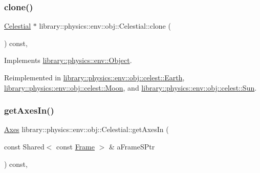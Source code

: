 \mbox{\label{classlibrary_1_1physics_1_1env_1_1obj_1_1_celestial_aaf8aa41a0ff9336eba62c07e3c27f82d}} 
\subsubsection{\texorpdfstring{clone()}{clone()}}
{\footnotesize\ttfamily \hyperlink{classlibrary_1_1physics_1_1env_1_1obj_1_1_celestial}{Celestial} $\ast$ library\+::physics\+::env\+::obj\+::\+Celestial\+::clone (\begin{DoxyParamCaption}{ }\end{DoxyParamCaption}) const\hspace{0.3cm}{\ttfamily [override]}, {\ttfamily [virtual]}}



Implements \hyperlink{classlibrary_1_1physics_1_1env_1_1_object_a498e0d1a15e937a5aa77374c6f899768}{library\+::physics\+::env\+::\+Object}.



Reimplemented in \hyperlink{classlibrary_1_1physics_1_1env_1_1obj_1_1celest_1_1_earth_aca39bec00a2046a3fcef9bf22be52428}{library\+::physics\+::env\+::obj\+::celest\+::\+Earth}, \hyperlink{classlibrary_1_1physics_1_1env_1_1obj_1_1celest_1_1_moon_a9d922ab338809a6c1052edbe11ce3e60}{library\+::physics\+::env\+::obj\+::celest\+::\+Moon}, and \hyperlink{classlibrary_1_1physics_1_1env_1_1obj_1_1celest_1_1_sun_a79fa2d336dad399c3d933b0f5a2f9427}{library\+::physics\+::env\+::obj\+::celest\+::\+Sun}.

\mbox{\label{classlibrary_1_1physics_1_1env_1_1obj_1_1_celestial_a51d7ed3c0dcf627fbbcd81f9b190fb6b}} 
\subsubsection{\texorpdfstring{get\+Axes\+In()}{getAxesIn()}}
{\footnotesize\ttfamily \hyperlink{classlibrary_1_1physics_1_1coord_1_1_axes}{Axes} library\+::physics\+::env\+::obj\+::\+Celestial\+::get\+Axes\+In (\begin{DoxyParamCaption}\item[{const Shared$<$ const \hyperlink{classlibrary_1_1physics_1_1coord_1_1_frame}{Frame} $>$ \&}]{a\+Frame\+S\+Ptr }\end{DoxyParamCaption}) const\hspace{0.3cm}{\ttfamily [override]}, {\ttfamily [virtual]}}




